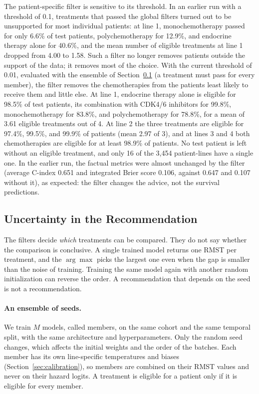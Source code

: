 \documentclass[a4paper,10pt]{article}
\begin{document}
The patient-specific filter is sensitive to its threshold. In an earlier run with a threshold of 0.1, treatments that passed the global filters turned out to be unsupported for most individual patients: at line 1, monochemotherapy passed for only 6.6\% of test patients, polychemotherapy for 12.9\%, and endocrine therapy alone for 40.6\%, and the mean number of eligible treatments at line 1 dropped from 4.00 to 1.58. Such a filter no longer removes patients outside the support of the data; it removes most of the choice. With the current threshold of 0.01, evaluated with the ensemble of Section~\ref{sec:rec-uncertainty} (a treatment must pass for every member), the filter removes the chemotherapies from the patients least likely to receive them and little else. At line 1, endocrine therapy alone is eligible for 98.5\% of test patients, its combination with CDK4/6 inhibitors for 99.8\%, monochemotherapy for 83.8\%, and polychemotherapy for 78.8\%, for a mean of 3.61 eligible treatments out of 4. At line 2 the three treatments are eligible for 97.4\%, 99.5\%, and 99.9\% of patients (mean 2.97 of 3), and at lines 3 and 4 both chemotherapies are eligible for at least 98.9\% of patients. No test patient is left without an eligible treatment, and only 16 of the 3,454 patient-lines have a single one. In the earlier run, the factual metrics were almost unchanged by the filter (average C-index 0.651 and integrated Brier score 0.106, against 0.647 and 0.107 without it), as expected: the filter changes the advice, not the survival predictions.

\subsection{Uncertainty in the Recommendation}
\label{sec:rec-uncertainty}

The filters decide \emph{which} treatments can be compared. They do not say whether the comparison is conclusive. A single trained model returns one RMST per treatment, and the $\arg\max$ picks the largest one even when the gap is smaller than the noise of training. Training the same model again with another random initialization can reverse the order. A recommendation that depends on the seed is not a recommendation.

\paragraph{An ensemble of seeds.} We train $M$ models, called members, on the same cohort and the same temporal split, with the same architecture and hyperparameters. Only the random seed changes, which affects the initial weights and the order of the batches. Each member has its own line-specific temperatures and biases (Section~\ref{sec:calibration}), so members are combined on their RMST values and never on their hazard logits. A treatment is eligible for a patient only if it is eligible for every member.
\end{document}
